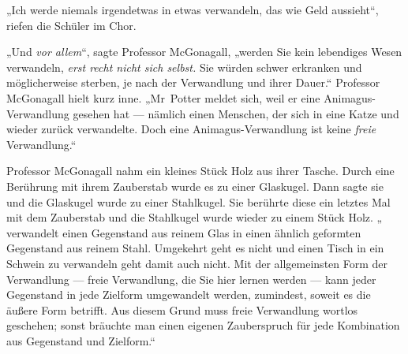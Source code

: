 „Ich werde niemals irgendetwas in etwas verwandeln, das wie Geld aussieht“, riefen die Schüler im Chor.

„Und \emph{vor allem}“, sagte Professor McGonagall, „werden Sie kein lebendiges Wesen verwandeln, \emph{erst recht nicht sich selbst.} Sie würden schwer erkranken und möglicherweise sterben, je nach der Verwandlung und ihrer Dauer.“ Professor McGonagall hielt kurz inne.
„Mr~Potter meldet sich, weil er eine Animagus-Verwandlung gesehen hat — nämlich einen Menschen, der sich in eine Katze und wieder zurück verwandelte. Doch eine Animagus-Verwandlung ist keine \emph{freie} Verwandlung.“

Professor McGonagall nahm ein kleines Stück Holz aus ihrer Tasche. Durch eine Berührung mit ihrem Zauberstab wurde es zu einer Glaskugel. Dann sagte sie  und die Glaskugel wurde zu einer Stahlkugel. Sie berührte diese ein letztes Mal mit dem Zauberstab und die Stahlkugel wurde wieder zu einem Stück Holz. „{} verwandelt einen Gegenstand aus reinem Glas in einen ähnlich geformten Gegenstand aus reinem Stahl. Umgekehrt geht es nicht und einen Tisch in ein Schwein zu verwandeln geht damit auch nicht. Mit der allgemeinsten Form der Verwandlung — freie Verwandlung, die Sie hier lernen werden — kann jeder Gegenstand in jede Zielform umgewandelt werden, zumindest, soweit es die äußere Form betrifft. Aus diesem Grund muss freie Verwandlung wortlos geschehen; sonst bräuchte man einen eigenen Zauberspruch für jede Kombination aus Gegenstand und Zielform.“

